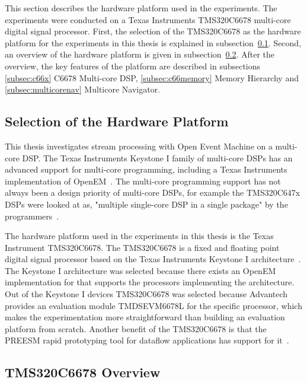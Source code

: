 This section describes the hardware platform used in the experiments. The experiments were conducted on a Texas Instruments TMS320C6678 multi-core digital signal processor. First, the selection of the TMS320C6678 as the hardware platform for the experiments in this thesis is explained in subsection~\ref{subsec:selection-of-platform}. Second, an overview of the hardware platform is given in subsection~\ref{subsec:hw-overview}. After the overview, the key features of the platform are described in subsections \ref{subsec:c66x} C6678 Multi-core DSP, \ref{subsec:c66memory} Memory Hierarchy and \ref{subsec:multicorenav} Multicore Navigator.

\subsection{Selection of the Hardware Platform}
\label{subsec:selection-of-platform}
This thesis investigates stream processing with Open Event Machine on a multi-core DSP. The Texas Instruments Keystone I family of multi-core DSPs has an advanced support for multi-core programming, including a Texas Instruments implementation of OpenEM~\cite{MCSDKbrochure}. The multi-core programming support has not always been a design priority of multi-core DSPs, for example the TMS320C647x DSPs were looked at as, "multiple single-core DSP in a single package" by the programmers~\cite{openemwhite}.

The hardware platform used in the experiments in this thesis is the Texas Instrument TMS320C6678. The TMS320C6678 is a fixed and floating point digital signal processor based on the Texas Instruments Keystone I architecture~\cite{tmsdatasheet}. The Keystone I architecture was selected because there exists an OpenEM implementation for that supports the processors implementing the architecture. Out of the Keystone I devices TMS320C6678 was selected because Advantech provides an evaluation module TMDSEVM6678L for the specific processor, which makes the experimentation more straightforward than building an evaluation platform from scratch. Another benefit of the TMS320C6678 is that the PREESM rapid prototyping tool for dataflow applications has support for it~\cite{pelcat2014prees}.

\subsection{TMS320C6678 Overview}
\label{subsec:hw-overview}

